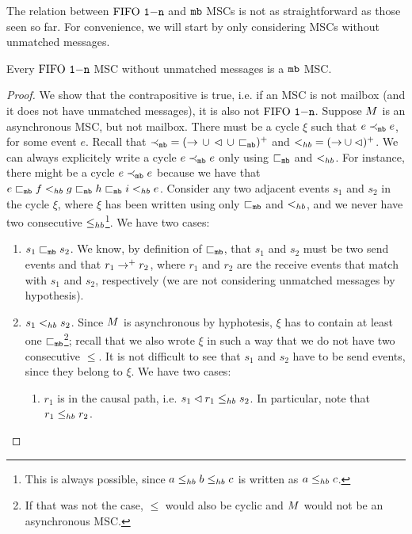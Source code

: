 The relation between $\text{FIFO } \mathtt{1\mathsf{-}n}$ and $\mathtt{mb}$ MSCs is not as 
straightforward as those seen so far. For convenience, we will 
start by only considering MSCs without unmatched messages. 

\begin{proposition} \label{prop:onen_mb_no_unmatched}
	Every $\text{FIFO } \mathtt{1\mathsf{-}n}$ MSC without unmatched messages is a $\mathtt{mb}$ MSC.
\end{proposition}
\begin{proof}
We show that the contrapositive is true, i.e. if an MSC is not mailbox (and it does not have unmatched messages), it is also not $\text{FIFO } \mathtt{1\mathsf{-}n}$. Suppose $M$ is an asynchronous MSC, but not mailbox. There must be a cycle $\xi$ such that  
$e \prec_{\mathtt{mb}} e$, for some event $e$. Recall that ${\prec_{\mathtt{mb}}} = ({\to} \,\cup\, {\lhd} \,\cup\, {\sqsubset_{\mathtt{mb}}})^+$ and ${<_{hb}} = ({\to} \cup {\lhd})^+$. 
We can always explicitely write a cycle $e \prec_{\mathtt{mb}} e$ only using $\sqsubset_{\mathtt{mb}}$ and $<_{hb}$. For instance, there might be a cycle $e \prec_{\mathtt{mb}} e$ because we have that $e \sqsubset_{\mathtt{mb}} f <_{hb} g \sqsubset_{\mathtt{mb}} h \sqsubset_{\mathtt{mb}} i <_{hb} e$. Consider any two adjacent events $s_1$ and $s_2$ in the cycle $\xi$, where $\xi$ has been written using only $\sqsubset_{\mathtt{mb}}$ and $<_{hb}$, and we never have two consecutive $\leq_{hb}$\footnote{This is always possible, since $a \leq_{hb} b \leq_{hb} c$ is written as $a \leq_{hb} c$.}. We have two cases:
\begin{enumerate}
	\item $s_1 \sqsubset_{\mathtt{mb}} s_2$. We know, by definition of $\sqsubset_{\mathtt{mb}}$, that $s_1$ and $s_2$ must be two send events and that $r_1 \to^+ r_2$, where $r_1$ and $r_2$ are the receive events that match with $s_1$ and $s_2$, respectively (we are not considering unmatched messages by hypothesis).
	\item $s_1 <_{hb} s_2$. Since $M$ is asynchronous by hyphotesis, $\xi$ has to contain at least one $\sqsubset_{\mathtt{mb}}$\footnote{If that was not the case, $\le$ would also be cyclic and $M$ would not be an asynchronous MSC.}; recall that we also wrote $\xi$ in such a way that we do not have two consecutive $\le$. It is not difficult to see that $s_1$ and $s_2$ have to be send events, since they belong to $\xi$. We have two cases:
	\begin{enumerate}
		\item $r_1$ is in the causal path, i.e. $s_1 \lhd r_1 \leq_{hb} s_2$. In particular, note that $r_1 \leq_{hb} r_2$.

\end{enumerate}
\end{enumerate}
\end{proof}
